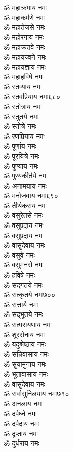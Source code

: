 \begin{multicols}{2}
\begin{flushleft}
ॐ महाक्रमाय नमः\\
ॐ महाकर्मणे नमः\\
ॐ महातेजसे नमः\\
ॐ महोरगाय नमः\\
ॐ महाक्रतवे नमः\\
ॐ महायज्वने नमः\\
ॐ महायज्ञाय नमः\\
ॐ महाहविषे नमः\\
ॐ स्तव्याय नमः\\
ॐ स्तवप्रियाय नमः\hfill ६८०\\
ॐ स्तोत्राय नमः\\
ॐ स्तुतये नमः\\
ॐ स्तोत्रे नमः\\
ॐ रणप्रियाय नमः\\
ॐ पूर्णाय नमः\\
ॐ पूरयित्रे नमः\\
ॐ पुण्याय नमः\\
ॐ पुण्यकीर्तये नमः\\
ॐ अनामयाय नमः\\
ॐ मनोजवाय नमः\hfill ६९०\\
ॐ तीर्थकराय नमः\\
ॐ वसुरेतसे नमः\\
ॐ वसुप्रदाय नमः\\
ॐ वसुप्रदाय नमः\\
ॐ वासुदेवाय नमः\\
ॐ वसुवे नमः\\
ॐ वसुमनसे नमः\\
ॐ हविषे नमः\\
ॐ सद्गतये नमः\\
ॐ सत्कृतये नमः\hfill ७००\\
ॐ सत्तायै नमः\\
ॐ सद्भूतये नमः\\
ॐ सत्परायणाय नमः\\
ॐ शूरसेनाय नमः\\
ॐ यदुश्रेष्ठाय नमः\\
ॐ सन्निवासाय नमः\\
ॐ सुयामुनाय नमः\\
ॐ भूतावासाय नमः\\
ॐ वासुदेवाय नमः\\
ॐ सर्वासुनिलयाय नमः\hfill ७१०\\
ॐ अनलाय नमः\\
ॐ दर्पघ्ने नमः\\
ॐ दर्पदाय नमः\\
ॐ दृप्ताय नमः\\
ॐ दुर्धराय नमः\\

\end{flushleft}
\end{multicols}
